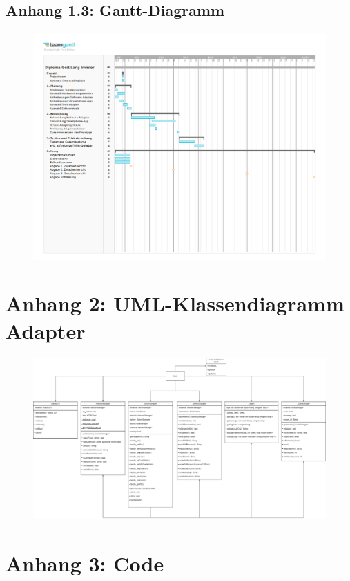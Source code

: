 \documentclass[11pt, twoside]{article}
\begin{document}
\subsection{Anhang 1.3: Gantt-Diagramm}
\begin{figure}[H]  
    \centering
    \includegraphics[width=\textheight, angle=90]{Gantt_final.png}
\end{figure}
\section{Anhang 2: UML-Klassendiagramm Adapter}
\begin{figure}[H]  
    \centering
    \includegraphics[width=\textheight, angle=90]{uml_klassen.png}
\end{figure}
\section{Anhang 3: Code}
\end{document}

